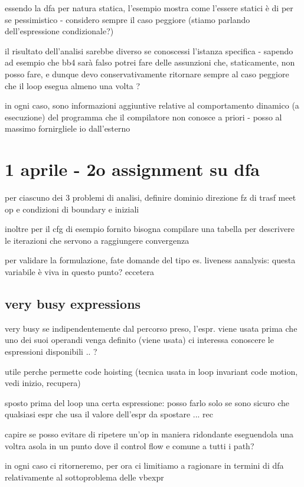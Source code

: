 essendo la dfa per natura statica, l'esempio mostra come l'essere statici \`e di per se pessimistico - considero sempre il caso peggiore (stiamo parlando dell'espressione condizionale?)

il risultato dell'analisi sarebbe diverso se conoscessi l'istanza specifica - sapendo ad esempio che bb4 sar\`a falso potrei fare delle assunzioni che, staticamente, non posso fare, e dunque devo conservativamente ritornare sempre al caso peggiore che il loop esegua almeno una volta ?

in ogni caso, sono informazioni aggiuntive relative al comportamento dinamico (a esecuzione) del programma che il compilatore non conosce a priori - posso al massimo fornirgliele io dall'esterno

\section{1 aprile - 2o assignment su dfa}

per ciascuno dei 3 problemi di analisi, definire dominio direzione fz di trasf meet op e condizioni di boundary e iniziali

inoltre per il cfg di esempio fornito bisogna compilare una tabella per descrivere le iterazioni che servono a raggiungere convergenza

per validare la formulazione, fate domande del tipo es. liveness aanalysis: questa variabile \`e viva in questo punto? eccetera

\subsection{very busy expressions}

very busy se indipendentemente dal percorso preso, l'espr. viene usata prima che uno dei suoi operandi venga definito (viene usata)
ci interessa conoscere le espressioni disponibili .. ?

utile perche permette code hoisting (tecnica usata in loop invariant code motion, vedi inizio, recupera)

sposto prima del loop una certa espressione: posso farlo solo se sono sicuro che qualsiasi espr che usa il valore dell'espr da spostare ... rec

capire se posso evitare di ripetere un'op in maniera ridondante eseguendola una voltra asola in un punto dove il control flow e comune a tutti i path?

in ogni caso ci ritorneremo, per ora ci limitiamo a ragionare in termini di dfa relativamente al sottoproblema delle vbexpr

